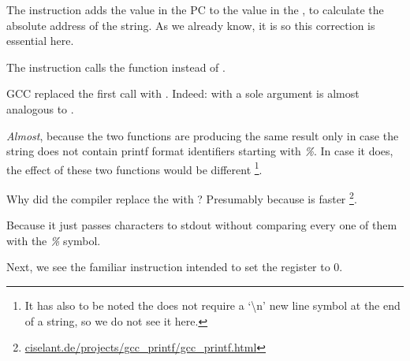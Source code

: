 The  instruction adds the value in the \ac{PC} to the value in the , to calculate the absolute address of the  string. 
As we already know, it is \q{\PICcode} so this correction is essential here.

The  instruction calls the \puts function instead of \printf.

\label{puts}

GCC replaced the first \printf call with \puts.
Indeed: \printf with a sole argument is almost analogous to \puts. 

\emph{Almost}, because the two functions are producing the same result only in case the 
string does not contain printf format identifiers starting with \emph{\%}. 
In case it does, the effect of these two functions would be different
\footnote{It has also to be noted the \puts does not require a `\textbackslash{}n' new line symbol 
at the end of a string, so we do not see it here.}.

Why did the compiler replace the \printf with \puts? Presumably because \puts is faster
\footnote{\href{http://go.yurichev.com/17063}{ciselant.de/projects/gcc\_printf/gcc\_printf.html}}. 

Because it just passes characters to \gls{stdout} without comparing every one of them with the \emph{\%} symbol.

Next, we see the familiar  instruction intended to set the  register to 0.
